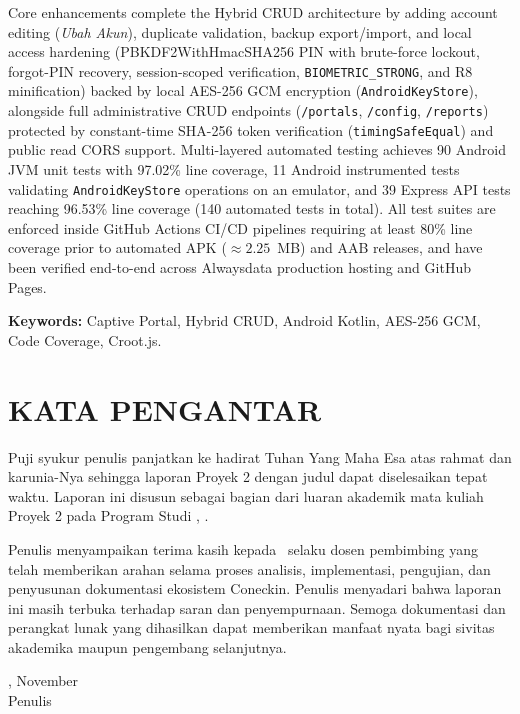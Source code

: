 Core enhancements complete the Hybrid CRUD architecture by adding account editing (\textit{Ubah Akun}), duplicate validation, backup export/import, and local access hardening (PBKDF2WithHmacSHA256 PIN with brute-force lockout, forgot-PIN recovery, session-scoped verification, \texttt{BIOMETRIC\_STRONG}, and R8 minification) backed by local AES-256 GCM encryption (\texttt{AndroidKeyStore}), alongside full administrative CRUD endpoints (\texttt{/portals}, \texttt{/config}, \texttt{/reports}) protected by constant-time SHA-256 token verification (\texttt{timingSafeEqual}) and public read CORS support. Multi-layered automated testing achieves 90 Android JVM unit tests with 97.02\% line coverage, 11 Android instrumented tests validating \texttt{AndroidKeyStore} operations on an emulator, and 39 Express API tests reaching 96.53\% line coverage (140 automated tests in total). All test suites are enforced inside GitHub Actions CI/CD pipelines requiring at least 80\% line coverage prior to automated APK ($\approx 2.25$~MB) and AAB releases, and have been verified end-to-end across Alwaysdata production hosting and GitHub Pages.

\vspace{0.5cm}
\noindent\textbf{Keywords:} Captive Portal, Hybrid CRUD, Android Kotlin, AES-256 GCM, Code Coverage, Croot.js.

\clearpage

\chapter*{KATA PENGANTAR}

Puji syukur penulis panjatkan ke hadirat Tuhan Yang Maha Esa atas rahmat dan karunia-Nya sehingga laporan Proyek 2 dengan judul \textit{\JudulLaporan} dapat diselesaikan tepat waktu. Laporan ini disusun sebagai bagian dari luaran akademik mata kuliah Proyek 2 pada Program Studi \NamaProdi, \NamaUniversitas.

Penulis menyampaikan terima kasih kepada \NamaDosenPembimbing\ selaku dosen pembimbing yang telah memberikan arahan selama proses analisis, implementasi, pengujian, dan penyusunan dokumentasi ekosistem Coneckin. Penulis menyadari bahwa laporan ini masih terbuka terhadap saran dan penyempurnaan. Semoga dokumentasi dan perangkat lunak yang dihasilkan dapat memberikan manfaat nyata bagi sivitas akademika maupun pengembang selanjutnya.

\vspace{1cm}
\begin{flushright}
\KotaKampus, November \TahunLaporan\\[1.5cm]
Penulis
\end{flushright}
\clearpage
